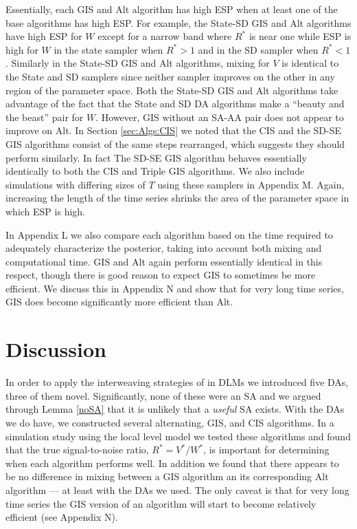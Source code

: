 \documentclass[12pt]{article}
\begin{document}
Essentially, each GIS and Alt algorithm has high ESP when at least one of the base algorithms has high ESP. For example, the State-SD GIS and Alt algorithms have high ESP for $W$ except for a narrow band where $R^*$ is near one while ESP is high for $W$ in the state sampler when $R^*>1$ and in the SD sampler when $R^*<1$. Similarly in the State-SD GIS and Alt algorithms, mixing for $V$ is identical to the State and SD samplers since neither sampler improves on the other in any region of the parameter space. Both the State-SD GIS and Alt algorithms take advantage of the fact that the State and SD DA algorithms make a ``beauty and the beast'' pair for $W$. However, GIS without an SA-AA pair does not appear to improve on Alt. In Section \ref{sec:Algs:CIS} we noted that the CIS and the SD-SE GIS algorithms consist of the same steps rearranged, which suggests they should perform similarly. In fact The SD-SE GIS algorithm behaves essentially identically to both the CIS and Triple GIS algorithms. We also include simulations with differing sizes of $T$ using these samplers in Appendix M. Again, increasing the length of the time series shrinks the area of the parameter space in which ESP is high.

In Appendix L we also compare each algorithm based on the time required to adequately characterize the posterior, taking into account both mixing and computational time. GIS and Alt again perform essentially identical in this respect, though there is good reason to expect GIS to sometimes be more efficient. We discuss this in Appendix N and show that for very long time series, GIS does become significantly more efficient than Alt.


\section{Discussion}\label{sec:Discuss}
In order to apply the interweaving strategies of \citet{yu2011center} in DLMs we introduced five DAs, three of them novel. Significantly, none of these were an SA and we argued through Lemma \ref{noSA} that it is unlikely that a {\it useful} SA exists. With the DAs we do have, we constructed several alternating, GIS, and CIS algorithms. In a simulation study using the local level model we tested these algorithms and found that the true signal-to-noise ratio, $R^*=V^*/W^*$, is important for determining when each algorithm performs well. In addition we found that there appears to be no difference in mixing between a GIS algorithm an its corresponding Alt algorithm --- at least with the DAs we used. The only caveat is that for very long time series the GIS version of an algorithm will start to become relatively efficient (see Appendix N). 
\end{document}
